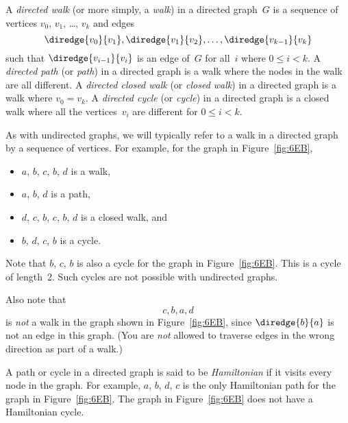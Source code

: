 \begin{definition}

A \emph{directed walk} (or more simply, a \emph{walk}) in a directed
graph~$G$ is a sequence of vertices $v_0$, $v_1$, \dots, $v_k$ and
edges
\begin{equation*}
    \diredge{v_0}{v_1}, \diredge{v_1}{v_2}, \dots, \diredge{v_{k - 1}}{v_k}
\end{equation*}
such that $\diredge{v_{i - 1}}{v_i}$ is an edge of~$G$ for all~$i$ where $0
\le i < k$.  A \emph{directed path} (or \emph{path}) in a directed
graph is a walk where the nodes in the walk are all different.  A
\emph{directed closed walk} (or \emph{closed walk}) in a directed
graph is a walk where $v_0 = v_k$.  A \emph{directed cycle} (or
\emph{cycle}) in a directed graph is a closed walk where all the
vertices~$v_i$ are different for $0 \le i < k$.
\end{definition}

As with undirected graphs, we will typically refer to a walk in a
directed graph by a sequence of vertices.  For example, for the graph
in Figure~\ref{fig:6EB},
\begin{itemize}

\item
$a$, $b$, $c$, $b$, $d$ is a walk,

\item
$a$, $b$, $d$ is a path,

\item
$d$, $c$, $b$, $c$, $b$, $d$ is a closed walk, and

\item
$b$, $d$, $c$, $b$ is a cycle.

\end{itemize}

Note that $b$, $c$, $b$ is also a cycle for the graph in
Figure~\ref{fig:6EB}.  This is a cycle of length~2.  Such cycles are
not possible with undirected graphs.

Also note that
\begin{equation*}
    c, b, a, d
\end{equation*}
is \emph{not} a walk in the graph shown in Figure~\ref{fig:6EB}, since
$\diredge{b}{a}$ is not an edge in this graph.  (You are \emph{not}
allowed to traverse edges in the wrong direction as part of a walk.)

A path or cycle in a directed graph is said to be \emph{Hamiltonian}
if it visits every node in the graph.  For example, $a$, $b$, $d$, $c$
is the only Hamiltonian path for the graph in Figure~\ref{fig:6EB}.
The graph in Figure~\ref{fig:6EB} does not have a Hamiltonian cycle.

